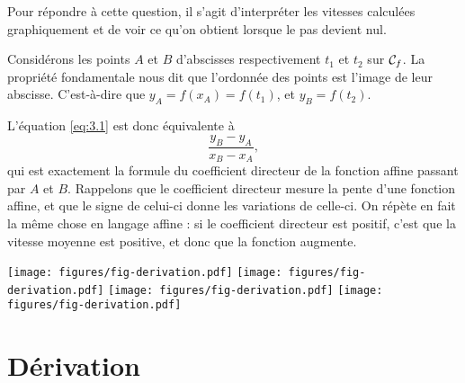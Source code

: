 Pour répondre à cette question, il s'agit d'interpréter les vitesses calculées graphiquement et de voir ce qu'on obtient lorsque le pas devient nul.

Considérons les points $A$ et $B$ d'abscisses respectivement $t_1$ et $t_2$ sur $\mathcal{C}_f$.
La propriété fondamentale nous dit que l'ordonnée des points est l'image de leur abscisse.
C'est-à-dire que $y_A = f(x_A) = f(t_1)$, et $y_B = f(t_2)$.

L'équation \eqref{eq:3.1} est donc équivalente à
	\[ \dfrac{y_B - y_A}{x_B - x_A}, \]
qui est exactement la formule du coefficient directeur de la fonction affine passant par $A$ et $B$.
Rappelons que le coefficient directeur mesure la pente d'une fonction affine, et que le signe de celui-ci donne les variations de celle-ci.
On répète en fait la même chose en langage affine : si le coefficient directeur est positif, c'est que la vitesse moyenne est positive, et donc que la fonction augmente.

\texttt{[image: figures/fig-derivation.pdf]}
\texttt{[image: figures/fig-derivation.pdf]}
\texttt{[image: figures/fig-derivation.pdf]}
\texttt{[image: figures/fig-derivation.pdf]}



\section{Dérivation}




